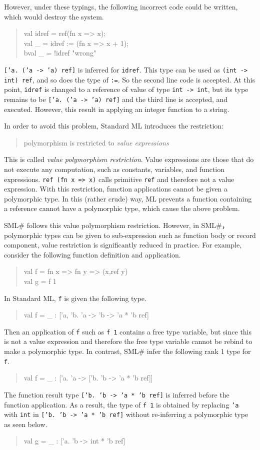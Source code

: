 \documentclass{jbook}
\newcommand{\smlsharp}{SML\#}
\newenvironment{program}{\begin{tt}\begin{quote}}{\end{quote}\end{tt}}
\begin{document}
	However, under these typings, the following incorrect code could 
be written, which would destroy the system.
\begin{program}
val idref = ref(fn x => x);\\
val \_ = idref := (fn x => x + 1);\\
bval \_ = !idref "wrong"
\end{program}
	{\tt ['a. ('a -> 'a) ref]} is inferred for {\tt idref}.
	This type can be used as {\tt (int -> int) ref}, and 
so does the type of {\tt :=}.
	So the second line code is accepted.
	At this point, {\tt idref} is changed to a reference of value of
type {\tt int -> int}, but its type remains to be {\tt ['a. ('a -> 'a)
ref]} and the third line is accepted, and executed.
	However, this result in applying an integer function to a string.

	In order to avoid this problem, Standard ML introduces the
restriction:
\begin{quote}
polymorphism is restricted to {\em value expressions}
\end{quote}
	This is called {\em value polymorphism restriction}.
	Value expressions are those that do not execute any computation,
such as constants, variables, and function expressions.
	{\tt ref (fn x => x)} calls primitive {\tt ref} and therefore
not a value expression.
	With this restriction, function applications cannot be given a
polymorphic type.
	In this (rather crude) way, ML prevents a function containing a
reference cannot have a polymorphic type, which cause the above problem.

	\smlsharp{} follows this value polymorphism restriction.
	However, in \smlsharp{}，polymorphic types can be given to
sub-expression such as function body or record component, value
restriction is significantly reduced in practice.
	For example, consider the following function definition and
application.
\begin{program}
val f = fn x => fn y => (x,ref y)\\
val g = f 1\\
\end{program}
	In Standard ML, {\tt f} is given the following type.
\begin{program}
val f = \_ : ['a, 'b. 'a -> 'b -> 'a * 'b ref]
\end{program}
	Then an application of {\tt f} such as {\tt f\ 1} contains a
free type variable, but since this is not a value expression and
therefore the free type variable cannot be rebind to make a polymorphic
type.
	In contrast, \smlsharp{} infer the following rank 1 type for
{\tt f}.
\begin{program}
val f = \_ : ['a. 'a -> ['b. 'b -> 'a * 'b ref]]
\end{program}
	The function result type {\tt ['b. 'b -> 'a * 'b ref]} is
inferred before the function application.
	As a result, the type of {\tt f\ 1} is obtained by replacing
{\tt 'a } with {\tt int} in {\tt ['b. 'b -> 'a * 'b ref]} without
re-inferring a polymorphic type as seen below.
\begin{program}
val g = \_ :  ['a. 'b -> int * 'b ref]
\end{program}
\fi%
\end{document}
